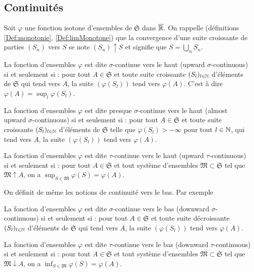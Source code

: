 \subsection{Continuités} \label{Continuites}
Soit $\varphi$ une fonction isotone d'ensembles de $\mathfrak{S}$ dans $\overline{\mathbb{R}}$. On rappelle (définitions \ref{Def:monotonie}, \ref{Def:limMonotone}) que la convergence d'une suite croissante de parties $(S_n)$ vers $S$ se note $(S_n)\uparrow S$ et signifie que $S=\bigcup_n S_n$.
\begin{defi}
La fonction d'ensembles $\varphi$ est dite $\sigma$-continue vers le haut (upward $\sigma$-continuous) si et seulement si : pour tout $A \in \mathfrak{S}$ et toute suite croissante $(S_l)_{l\in \mathbb{N}}$ d'éléments de $\mathfrak{S}$ qui tend vers $A$, la suite $(\varphi(S_l))$ tend vers $\varphi(A)$. C'est à dire $\varphi(A) = \sup_{l}\varphi(S_l)$.
\end{defi}
\begin{defi}
La fonction d'ensembles $\varphi$ est dite presque $\sigma$-continue vers le haut (almost upward $\sigma$-continuous) si et seulement si : pour tout $A \in \mathfrak{S}$ et toute suite croissante $(S_l)_{l\in \mathbb{N}}$ d'éléments de $\mathfrak{S}$ telle que $\varphi(S_l)> - \infty$ pour tout $l\in \mathbb{N}$, qui tend vers $A$, la suite $(\varphi(S_l))$ tend vers $\varphi(A)$.
\end{defi}
\begin{defi}
 La fonction d'ensembles $\varphi$ est dite $\tau$-continue vers le haut (upward $\tau$-continuous) si et seulement si :
pour tout $A \in \mathfrak{S}$ et tout système d'ensembles $\mathfrak{M} \subset \mathfrak{S}$ tel que $\mathfrak{M} \uparrow A$, on a $\sup_{S \in \mathfrak{M}}\varphi(S) = \varphi(A)$.
\end{defi}
On définit de même les notions de continuité vers le bas. Par exemple
\begin{defi}
La fonction d'ensembles $\varphi$ est dite $\sigma$-continue vers le bas (downward $\sigma$-continuous) si et seulement si : pour tout $A \in \mathfrak{S}$ et toute suite décroissante $(S_l)_{l\in \mathbb{N}}$ d'éléments de $\mathfrak{S}$ qui tend vers $A$, la suite $(\varphi(S_l))$ tend vers $\varphi(A)$.
\end{defi}
\begin{defi}
 La fonction d'ensembles $\varphi$ est dite $\tau$-continue vers le bas (downward $\tau$-continuous) si et seulement si :
pour tout $A \in \mathfrak{S}$ et tout système d'ensembles $\mathfrak{M} \subset \mathfrak{S}$ tel que $\mathfrak{M} \downarrow A$, on a $\inf_{S \in \mathfrak{M}}\varphi(S) = \varphi(A)$.
\end{defi}

